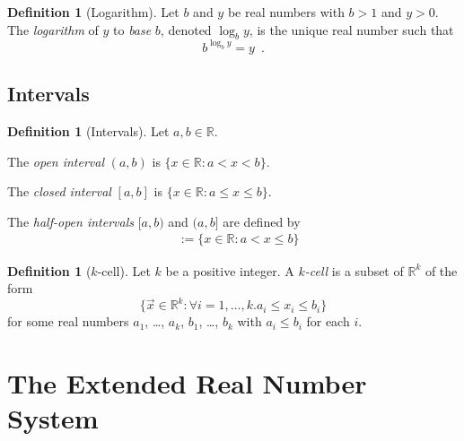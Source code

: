 \documentclass{book}
\theoremstyle{definition}
\newtheorem{df}[prop]{Definition}
\begin{document}
\begin{df}[Logarithm]
Let $b$ and $y$ be real numbers with $b > 1$ and $y > 0$. The \emph{logarithm} of $y$ to \emph{base} $b$, denoted $\log_b y$, is the unique real number such that
\[ b^{\log_b y} = y \enspace . \]
\end{df}

\subsection{Intervals}

\begin{df}[Intervals]
Let $a, b \in \mathbb{R}$. 

The \emph{open interval} $(a,b)$ is $\{ x \in \mathbb{R} : a < x < b \}$.

The \emph{closed interval} $[a,b]$ is $\{ x \in \mathbb{R} : a \leq x \leq b \}$.

The \emph{half-open intervals} $[a,b)$ and $(a,b]$ are defined by
\begin{align*}
[a,b) & := \{ x \in \mathbb{R} : a \leq x < b \} \\
(a,b] & := \{ x \in \mathbb{R} : a < x \leq b \}
\end{align*}
\end{df}

\begin{df}[$k$-cell]
Let $k$ be a positive integer. A \emph{$k$-cell} is a subset of $\mathbb{R}^k$ of the form
\[ \{ \vec{x} \in \mathbb{R}^k : \forall i = 1, \ldots, k. a_i \leq x_i \leq b_i \} \]
for some real numbers $a_1$, \ldots, $a_k$, $b_1$, \ldots, $b_k$ with $a_i \leq b_i$ for each $i$.
\end{df}

\section{The Extended Real Number System}
\end{document}
